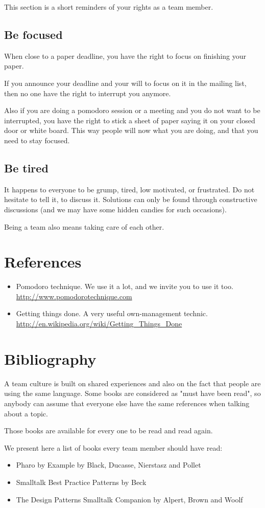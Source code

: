 \documentclass[10pt]{article}
\begin{document}
This section is a short reminders of your rights as a team member.

\subsection{Be focused}

When close to a paper deadline, you have the right to focus on finishing your paper.

If you announce your deadline and your will to focus on it in the mailing list, then no one have the right to interrupt you anymore.

Also if you are doing a pomodoro session or a meeting and you do not want to be interrupted, you have the right to stick a sheet of paper saying it on your closed door or white board. This way people will now what you are doing, and that you need to stay focused.

\subsection{Be tired}

It happens to everyone to be grump, tired, low motivated, or frustrated. Do not hesitate to tell it, to discuss it. Solutions can only be found through constructive discussions (and we may have some hidden candies for such occasions).

Being a team also means taking care of each other.

\section{References}
\begin{itemize}
\item Pomodoro technique. We use it a lot, and we invite you to use it too. \url{http://www.pomodorotechnique.com}
\item Getting things done. A very useful own-management technic.  \url{http://en.wikipedia.org/wiki/Getting_Things_Done}
\end{itemize}

\section{Bibliography}

A team culture is built on shared experiences and also on the fact that people are using the same language.
Some books are considered as "must have been read", so anybody can assume that everyone else have the same references when talking about a topic.

Those books are available for every one to be read and read again.

We present here a list of books every team member should have read:
\begin{itemize}
\item Pharo by Example by Black, Ducasse, Nierstasz and Pollet
\item Smalltalk Best Practice Patterns by Beck
\item The Design Patterns Smalltalk Companion by Alpert, Brown and Woolf
\end{itemize}
\end{document}

